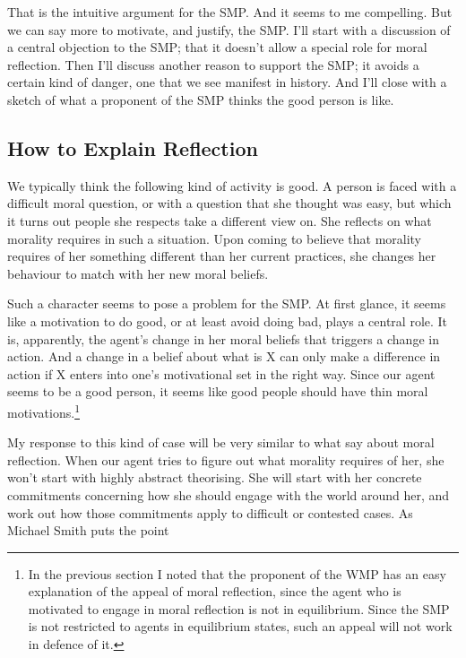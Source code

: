 That is the intuitive argument for the SMP. And it seems to me compelling. But we can say more to motivate, and justify, the SMP. I'll start with a discussion of a central objection to the SMP; that it doesn't allow a special role for moral reflection. Then I'll discuss another reason to support the SMP; it avoids a certain kind of danger, one that we see manifest in history. And I'll close with a sketch of what a proponent of the SMP thinks the good person is like.

\subsection{How to Explain Reflection}
\label{howtoexplainreflection}

We typically think the following kind of activity is good. A person is faced with a difficult moral question, or with a question that she thought was easy, but which it turns out people she respects take a different view on. She reflects on what morality requires in such a situation. Upon coming to believe that morality requires of her something different than her current practices, she changes her behaviour to match with her new moral beliefs.

Such a character seems to pose a problem for the SMP. At first glance, it seems like a motivation to do good, or at least avoid doing bad, plays a central role. It is, apparently, the agent's change in her moral beliefs that triggers a change in action. And a change in a belief about what is X can only make a difference in action if X enters into one's motivational set in the right way. Since our agent seems to be a good person, it seems like good people should have thin moral motivations.\footnote{In the previous section I noted that the proponent of the WMP has an easy explanation of the appeal of moral reflection, since the agent who is motivated to engage in moral reflection is not in equilibrium. Since the SMP is not restricted to agents in equilibrium states, such an appeal will not work in defence of it.}

My response to this kind of case will be very similar to what \citet[185ff]{ArpalySchroeder2014} say about moral reflection. When our agent tries to figure out what morality requires of her, she won't start with highly abstract theorising. She will start with her concrete commitments concerning how she should engage with the world around her, and work out how those commitments apply to difficult or contested cases. As Michael Smith puts the point

